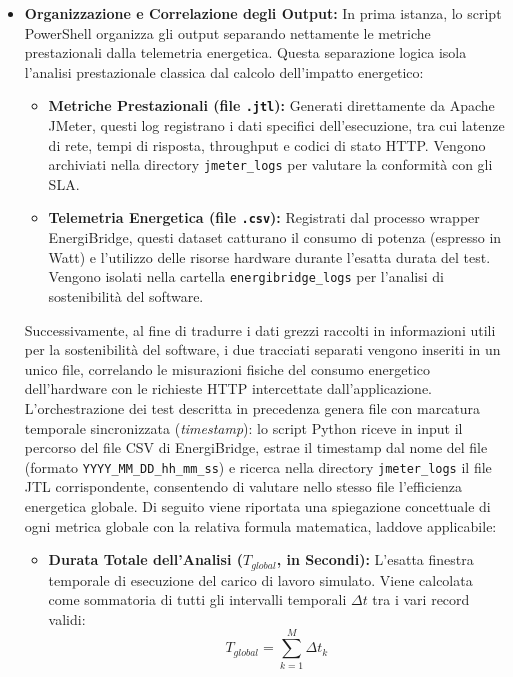 \begin{itemize}
    \item \textbf{Organizzazione e Correlazione degli Output:} In prima istanza, lo script PowerShell organizza gli output separando nettamente le metriche prestazionali dalla telemetria energetica. Questa separazione logica isola l'analisi prestazionale classica dal calcolo dell'impatto energetico:
    \begin{itemize}
        \item \textbf{Metriche Prestazionali (file \texttt{.jtl}):} Generati direttamente da Apache JMeter, questi log registrano i dati specifici dell'esecuzione, tra cui latenze di rete, tempi di risposta, throughput e codici di stato HTTP. Vengono archiviati nella directory \texttt{jmeter\_logs} per valutare la conformità con gli SLA.
        \item \textbf{Telemetria Energetica (file \texttt{.csv}):} Registrati dal processo wrapper EnergiBridge, questi dataset catturano il consumo di potenza (espresso in Watt) e l'utilizzo delle risorse hardware durante l'esatta durata del test. Vengono isolati nella cartella \texttt{energibridge\_logs} per l'analisi di sostenibilità del software.
    \end{itemize}
    Successivamente, al fine di tradurre i dati grezzi raccolti in informazioni utili per la sostenibilità del software, i due tracciati separati vengono inseriti in un unico file, correlando le misurazioni fisiche del consumo energetico dell'hardware con le richieste HTTP intercettate dall'applicazione. L'orchestrazione dei test descritta in precedenza genera file con marcatura temporale sincronizzata (\textit{timestamp}): lo script Python riceve in input il percorso del file CSV di EnergiBridge, estrae il timestamp dal nome del file (formato \texttt{YYYY\_MM\_DD\_hh\_mm\_ss}) e ricerca nella directory \texttt{jmeter\_logs} il file JTL corrispondente, consentendo di valutare nello stesso file l'efficienza energetica globale. Di seguito viene riportata una spiegazione concettuale di ogni metrica globale con la relativa formula matematica, laddove applicabile:
		\begin{itemize}
		    \item \textbf{Durata Totale dell'Analisi ($T_{global}$, in Secondi):} L'esatta finestra temporale di esecuzione del carico di lavoro simulato. Viene calcolata come sommatoria di tutti gli intervalli temporali $\Delta t$ tra i vari record validi:
		    \begin{equation}
		        T_{global} = \sum_{k=1}^{M} \Delta t_k
		    \end{equation}


\end{itemize}
\end{itemize}
